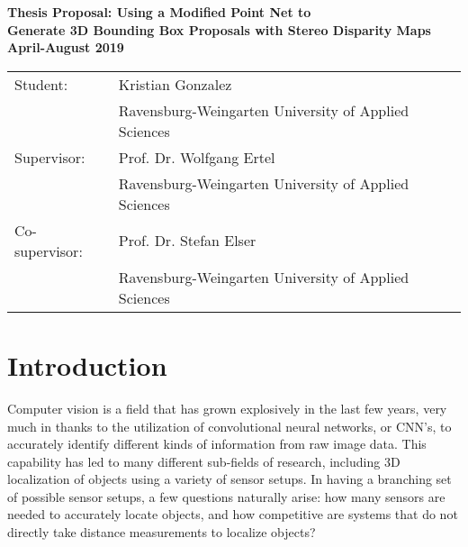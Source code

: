 \begin{center}
    \large
    \textbf{Thesis Proposal: Using a Modified Point Net to \\ Generate 3D Bounding Box Proposals with Stereo Disparity Maps}\\
    \noindent \textbf{April-August 2019}\\
    \normalsize 
\end{center}

\begin{tabular}{ll}
    Student: & Kristian Gonzalez \\
    & Ravensburg-Weingarten University of Applied Sciences\\
    Supervisor: & Prof. Dr. Wolfgang Ertel \\
    & Ravensburg-Weingarten University of Applied Sciences\\
    Co-supervisor: & Prof. Dr. Stefan Elser\\
    & Ravensburg-Weingarten University of Applied Sciences\\
\end{tabular}


\section{Introduction}
Computer vision is a field that has grown explosively in the last few years, very much in thanks to the utilization of convolutional neural networks, or CNN's, to accurately identify different kinds of information from raw image data. This capability has led to many different sub-fields of research, including 3D localization of objects using a variety of sensor setups. In having a branching set of possible sensor setups, a few questions naturally arise: how many sensors are needed to accurately locate objects, and how competitive are systems that do not directly take distance measurements to localize objects? 

